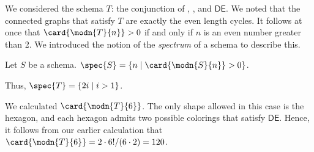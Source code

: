 We considered the schema $T$: the conjunction of \sg, \twor, and $\mathsf{DE}$.
We noted that the connected graphs that satisfy $T$ are exactly the even length cycles. It follows at once that $\card{\modn{T}{n}}>0$ if and only if $n$ is an even number greater than 2. We introduced the notion of the \emph{spectrum} of a schema to describe this.
\begin{definition}
Let $S$ be a schema. $\spec{S}=\{n\mid \card{\modn{S}{n}}>0\}$.
\end{definition}
Thus, $\spec{T}=\{2i\mid i>1\}$.

We calculated $\card{\modn{T}{6}}$. The only shape allowed in this case is the hexagon, and each hexagon admits two possible colorings that satisfy $\mathsf{DE}$. Hence, it follows from our earlier calculation that $\card{\modn{T}{6}}=2\cdot6!/(6\cdot2)=120$.